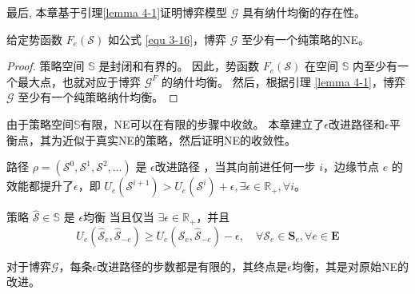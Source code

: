 最后, 本章基于引理\ref{lemma 4-1}证明博弈模型 $\mathcal{G}$ 具有纳什均衡的存在性。
\begin{theorem}
	给定势函数 $F_{e}(\mathcal{S})$ 如公式 \ref{equ 3-16}，博弈 $\mathcal{G}$ 至少有一个纯策略的NE。
\label{theorem 4-2}
\end{theorem}
\begin{proof}
策略空间 $\mathbb{S}$ 是封闭和有界的。 
因此，势函数 $F_{e}(\mathcal{S})$ 在空间 $\mathbb{S}$ 内至少有一个最大点，也就对应于博弈 $\mathcal{G}^{F}$ 的纳什均衡。 
然后，根据引理 \ref{lemma 4-1}，博弈 $\mathcal{G}$ 至少有一个纯策略纳什均衡。
\end{proof}
\noindent 由于策略空间$\mathbb{S}$有限，NE可以在有限的步骤中收敛。
本章建立了$\epsilon$改进路径和$\epsilon$平衡点\cite{chew2016potential}，其为近似于真实NE的策略，然后证明NE的收敛性。
\begin{definition} 
	路径 $\rho=\left(\mathcal{S}^{0}, \mathcal{S}^{1}, \mathcal{S}^{2}, \ldots\right)$ 是 $\epsilon$改进路径 \cite{chew2016potential}，当其向前进任何一步 $i$，边缘节点 $e$ 的效能都提升了$\epsilon$，即 $U_{e}\left(\mathcal{S}^{i+1}\right) > U_{e}\left(\mathcal{S}^{i}\right) + \epsilon, \exists \epsilon \in \mathbb{R}_{+}, \forall i$。
\end{definition}
\begin{definition}
	策略 $\mathcal{\hat{S}} \in \mathbb{S}$ 是 $\epsilon$均衡 \cite{chew2016potential} 当且仅当 $\exists \epsilon \in \mathbb{R}_{+}$，并且
	\begin{equation}
		U_{e}\left(\mathcal{\hat{S}}_{e}, \mathcal{\hat{S}}_{-e}\right) \geq U_{e}\left(\mathcal{S}_{e}, \mathcal{\hat{S}}_{-e}\right) - \epsilon, \quad \forall \mathcal{S}_{e} \in \mathbf{S}_{e}, \forall e \in \mathbf{E}
	\end{equation}
\end{definition}
\begin{theorem}
对于博弈$\mathcal{G}$，每条$\epsilon$改进路径的步数都是有限的，其终点是$\epsilon$均衡，其是对原始NE的改进。
\label{theorem 4-3}
\end{theorem}

